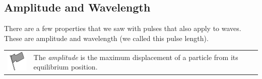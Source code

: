             \subsection{ Amplitude and Wavelength}
            \nopagebreak
        \label{m38806*id318000}There are a few properties that we saw with pulses that also apply to waves. These are amplitude and wavelength (we called this pulse length).\par 
\label{m38806*fhsst!!!underscore!!!id143}\begin{definition}
	  \begin{tabular*}{15 cm}{m{15 mm}m{}}
	\hspace*{-50pt}  \includegraphics[width=0.5in]{col11305.imgs/psflag2.png}   & \Definition{   \label{id2439313}\textbf{ Amplitude }} { \label{m38806*meaningfhsst!!!underscore!!!id143}
        \label{m38806*id318011}The \textsl{amplitude} is the maximum displacement of a particle from its equilibrium position. \par 
         } 
      \end{tabular*}
      \end{definition}
\label{m38806*secfhsst!!!underscore!!!id146}
